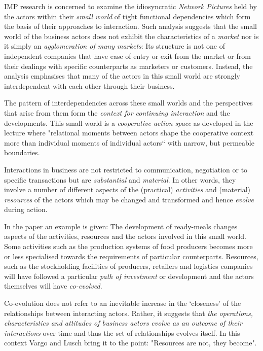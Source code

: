 \documentclass[11pt,a4paper]{article}
\begin{document}
IMP research is concerned to examine the idiosyncratic \emph{Network Pictures}
held by the actors within their \emph{small world} of tight functional
dependencies which form the basis of their approaches to interaction.  Such
analysis suggests that the small world of the business actors does not exhibit
the characteristics of a \emph{market} nor is it simply an \emph{agglomeration
  of many markets}: Its structure is not one of independent companies that
have ease of entry or exit from the market or from their dealings with speciﬁc
counterparts as marketers or customers. Instead, the analysis emphasises that
many of the actors in this small world are strongly interdependent with each
other through their business.

The pattern of interdependencies across these small worlds and the
perspectives that arise from them form the \emph{context for continuing
  interaction} and the developments.  This small world is a \emph{cooperative
  action space} as developed in the lecture where "relational moments between
actors shape the cooperative context more than individual moments of
individual actors“ with narrow, but permeable boundaries.

Interactions in business are not restricted to communication, negotiation or
to speciﬁc transactions but are \emph{substantial} and \emph{material}. In
other words, they involve a number of different aspects of the (practical)
\emph{activities} and (material) \emph{resources} of the actors which may be
changed and transformed and hence \emph{evolve} during action.

In the paper an example is given: The development of ready-meals changes
aspects of the activities, resources and the actors involved in this small
world. Some activities such as the production systems of food producers
becomes more or less specialised towards the requirements of particular
counterparts.  Resources, such as the stockholding facilities of producers,
retailers and logistics companies will have followed a particular \emph{path
  of investment} or development and the actors themselves will have
\emph{co-evolved}.

Co-evolution does not refer to an inevitable increase in the ‘closeness’ of
the relationships between interacting actors. Rather, it suggests that
\emph{the operations, characteristics and attitudes of business actors evolve
  as an outcome of their interactions} over time and thus the set of
relationships evolves itself.  In this context Vargo and Lusch bring it to the
point: "Resources are not, they become".
\end{document}

